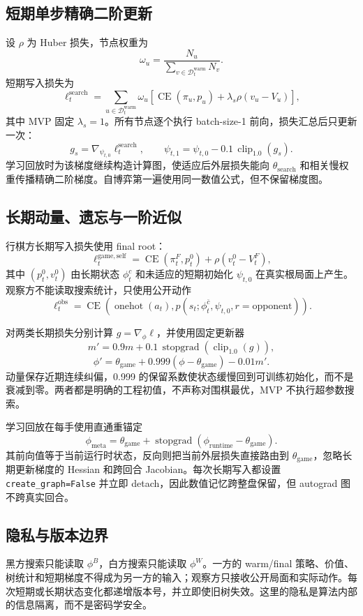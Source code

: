 \documentclass[UTF8,11pt,a4paper]{ctexart}
\newcommand{\gameinit}{\theta_{\mathrm{game}}}
\newcommand{\searchinit}{\theta_{\mathrm{search}}}
\newcommand{\stopgrad}{\operatorname{stopgrad}}
\newcommand{\clipnorm}{\operatorname{clip}_{1.0}}
\newcommand{\code}[1]{\texttt{#1}}
\begin{document}
\subsection{短期单步精确二阶更新}

设 $\rho$ 为 Huber 损失，节点权重为
\[
  \omega_u=\frac{N_u}{\sum_{v\in\mathcal D_t^{\mathrm{warm}}}N_v}.
\]
短期写入损失为
\[
  \ell_t^{\mathrm{search}}
  =\sum_{u\in\mathcal D_t^{\mathrm{warm}}}\omega_u
   \left[\operatorname{CE}(\pi_u,p_u)
   +\lambda_s\rho(v_u-V_u)\right],
\]
其中 MVP 固定 $\lambda_s=1$。所有节点逐个执行 batch-size-1 前向，损失汇总后只更新一次：
\[
  g_s=\nabla_{\psi_{t,0}}\ell_t^{\mathrm{search}},\qquad
  \psi_{t,1}=\psi_{t,0}-0.1\,\clipnorm(g_s).
\]
学习回放时为该梯度继续构造计算图，使适应后外层损失能向 $\searchinit$ 和相关慢权重传播精确二阶梯度。自博弈第一遍使用同一数值公式，但不保留梯度图。

\subsection{长期动量、遗忘与一阶近似}

行棋方长期写入损失使用 final root：
\[
  \ell_t^{\mathrm{game,self}}
  =\operatorname{CE}(\pi_t^F,p_t^0)
   +\rho(v_t^0-V_t^F),
\]
其中 $(p_t^0,v_t^0)$ 由长期状态 $\phi_t^c$ 和未适应的短期初始化 $\psi_{t,0}$ 在真实根局面上产生。观察方不能读取搜索统计，只使用公开动作
\[
  \ell_t^{\mathrm{obs}}
  =\operatorname{CE}\!\left(
      \operatorname{onehot}(a_t),
      p(s_t;\phi_t^{\bar c},\psi_{t,0},r=\mathrm{opponent})
    \right).
\]

对两类长期损失分别计算 $g=\nabla_\phi\ell$，并使用固定更新器
\[
  m'=0.9m+0.1\,\stopgrad\!\left(\clipnorm(g)\right),
\]
\[
  \phi'=\gameinit+0.999(\phi-\gameinit)-0.01m'.
\]
动量保存近期连续纠偏，0.999 的保留系数使状态缓慢回到可训练初始化，而不是衰减到零。两者都是明确的工程初值，不声称对围棋最优，MVP 不执行超参数搜索。

学习回放在每手使用直通重锚定
\[
  \phi_{\mathrm{meta}}
  =\gameinit+\stopgrad(\phi_{\mathrm{runtime}}-\gameinit).
\]
其前向值等于当前运行时状态，反向则把当前外层损失直接路由到 $\gameinit$，忽略长期更新梯度的 Hessian 和跨回合 Jacobian。每次长期写入都设置 \code{create\_graph=False} 并立即 detach，因此数值记忆跨整盘保留，但 autograd 图不跨真实回合。

\subsection{隐私与版本边界}

黑方搜索只能读取 $\phi^B$，白方搜索只能读取 $\phi^W$。一方的 warm/final 策略、价值、树统计和短期梯度不得成为另一方的输入；观察方只接收公开局面和实际动作。每次短期或长期状态变化都递增版本号，并立即使旧树失效。这里的隐私是算法内部的信息隔离，而不是密码学安全。
\end{document}
